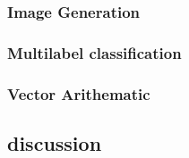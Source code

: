 \subsubsection{Image Generation}
\subsubsection{Multilabel classification}
\subsubsection{Vector Arithematic}

\subsection{discussion}

